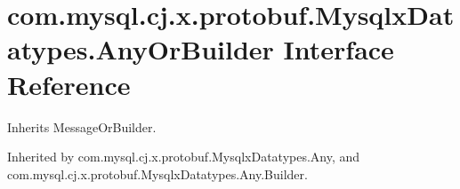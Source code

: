 \hypertarget{interfacecom_1_1mysql_1_1cj_1_1x_1_1protobuf_1_1_mysqlx_datatypes_1_1_any_or_builder}{}\section{com.\+mysql.\+cj.\+x.\+protobuf.\+Mysqlx\+Datatypes.\+Any\+Or\+Builder Interface Reference}
\label{interfacecom_1_1mysql_1_1cj_1_1x_1_1protobuf_1_1_mysqlx_datatypes_1_1_any_or_builder}


Inherits Message\+Or\+Builder.



Inherited by com.\+mysql.\+cj.\+x.\+protobuf.\+Mysqlx\+Datatypes.\+Any, and com.\+mysql.\+cj.\+x.\+protobuf.\+Mysqlx\+Datatypes.\+Any.\+Builder.

